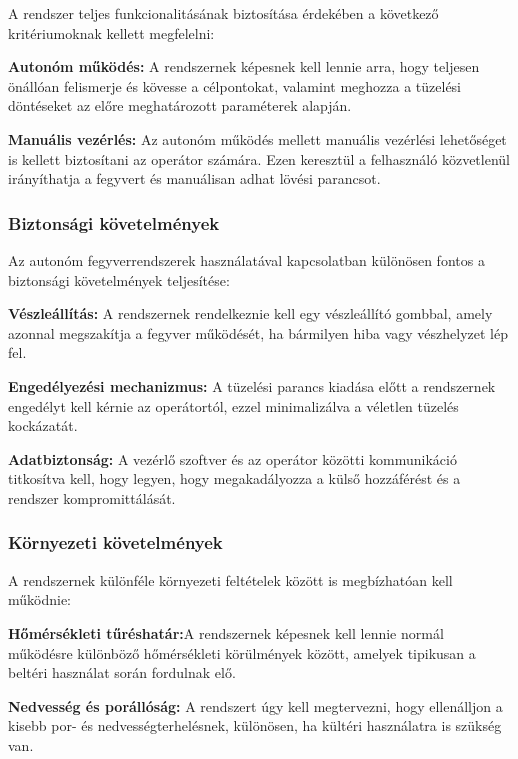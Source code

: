 \documentclass[12pt,a4paper]{article}
\begin{document}
A rendszer teljes funkcionalitásának biztosítása érdekében a következő kritériumoknak kellett megfelelni:

\begin{list}{}{}
	\item \textbf{Autonóm működés:} A rendszernek képesnek kell lennie arra, hogy teljesen önállóan felismerje és kövesse a célpontokat, valamint meghozza a tüzelési döntéseket az előre meghatározott paraméterek alapján.
	\item \textbf{Manuális vezérlés:} Az autonóm működés mellett manuális vezérlési lehetőséget is kellett biztosítani az operátor számára. Ezen keresztül a felhasználó közvetlenül irányíthatja a fegyvert és manuálisan adhat lövési parancsot.
\end{list}

\subsubsection*{Biztonsági követelmények}

Az autonóm fegyverrendszerek használatával kapcsolatban különösen fontos a biztonsági követelmények teljesítése:

\begin{list}{}{}
	\item \textbf{Vészleállítás:} A rendszernek rendelkeznie kell egy vészleállító gombbal, amely azonnal megszakítja a fegyver működését, ha bármilyen hiba vagy vészhelyzet lép fel.
	\item \textbf{Engedélyezési mechanizmus:} A tüzelési parancs kiadása előtt a rendszernek engedélyt kell kérnie az operátortól, ezzel minimalizálva a véletlen tüzelés kockázatát.
	\item\textbf{ Adatbiztonság:} A vezérlő szoftver és az operátor közötti kommunikáció titkosítva kell, hogy legyen, hogy megakadályozza a külső hozzáférést és a rendszer kompromittálását.
\end{list}

\subsubsection*{Környezeti követelmények}

A rendszernek különféle környezeti feltételek között is megbízhatóan kell működnie:

\begin{list}{}{}
	\item \textbf{Hőmérsékleti tűréshatár:}A rendszernek képesnek kell lennie normál működésre különböző hőmérsékleti körülmények között, amelyek tipikusan a beltéri használat során fordulnak elő.
	\item \textbf{Nedvesség és porállóság:} A rendszert úgy kell megtervezni, hogy ellenálljon a kisebb por- és nedvességterhelésnek, különösen, ha kültéri használatra is szükség van.
\end{list}
\end{document}
